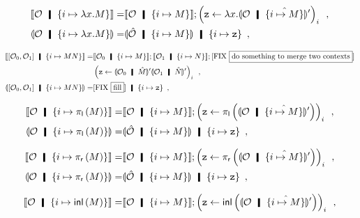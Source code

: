 {\begin{description}
\begin{align*}
\end{align*}
 \item[${\brac{i}}\bot\elim$] 
 \item[$\brac i\supset\intro$] 
\begin{align*}
 \semo{\hypert\hmid \{i\mapsto \lambda x.M\}}=
 & \semo{\hypert\hmid \imapsto{M}}; \left(\p z\leftarrow
 \lambda x. \semoi{\hypert\hmid\hat{\imapsto{M}}}'\right)_i \enspace,\\
 \semoi{\hypert\hmid \imapsto{\lambda x.M}} =& \semoi{\hat\hypert\hmid
 \imapsto{M}} \hmid \{i\mapsto \p z\}\enspace,
\end{align*}
 \item[$\brac i\supset\elim$] 
\begin{align*}
 \semo{\cotuple{\hypert_0,\hypert_1}\hmid \imapsto{MN}}=&
 \semo{\hypert_0\hmid \imapsto{M}};
 \semo{\hypert_1\hmid \imapsto{N}}; \text{\fix{do something to merge two
 contexts}}\\&
 \left(\p z\leftarrow \semoi{\hypert_0\hmid \hat
 M}'\semoi{\hypert_1\hmid \hat N}'\right)_i\enspace,\\
 \semoi{\cotuple{\hypert_0,\hypert_1}\hmid \imapsto{MN}} =&
 \text{\fix{fill}}
 \hmid \{i\mapsto \p z\}\enspace,
\end{align*}
 \item[$\brac i\wedge\elim_0$] 
\begin{align*}
 \semo{\hypert\hmid \imapsto{\lpil M}} =& \semo{\hypert\hmid \imapsto{M}};
 \left(\p z \leftarrow
 \lpil {\semoi{\hypert\hmid\hat{\imapsto{M}}}'}\right)_i\enspace, \\
 \semoi{\hypert\hmid \imapsto{\lpil M}}=& \semoi{\hat \hypert\hmid
 \imapsto{M}}\hmid \{{i\mapsto \p z}\}\enspace,
\end{align*}
 \item[$\brac i\wedge\elim_1$] 
\begin{align*}
 \semo{\hypert\hmid \imapsto{\lpir M}} =& \semo{\hypert\hmid \imapsto{M}};
 \left(\p z \leftarrow
 \lpir{ \semoi{\hypert\hmid\hat{\imapsto{M}}}' }\right)_i\enspace, \\
 \semoi{\hypert\hmid \imapsto{\lpir{M}}}=& \semoi{\hat \hypert\hmid
 \imapsto{M}}\hmid
 \{{i\mapsto \p z}\}\enspace,
\end{align*}
 \item[$\brac i\vee\intro_0$] 
\begin{align*}
 \semo{\hypert\hmid \imapsto{\linl{M}}} =
 & \semo{\hypert\hmid \imapsto{M}}; \left(\p z \leftarrow
 \linl{ \semoi{\hypert\hmid\hat{\imapsto{M}}}'}\right)_i\enspace, \\

\end{align*}
\end{description}}
